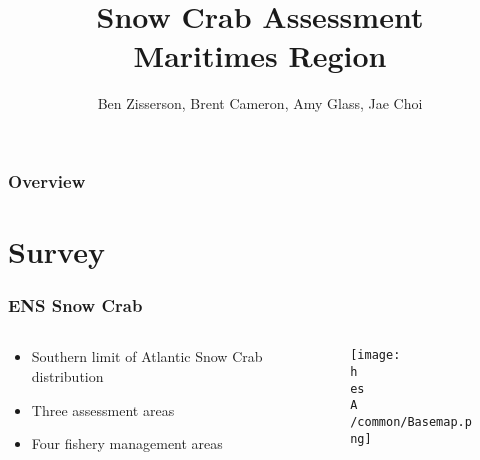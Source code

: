 \documentclass{beamer}
\title[Snow Crab Assessment \yr]{Snow Crab Assessment\\  Maritimes Region\\ \yr }
\author[Snow Crab Unit]{Ben Zisserson, Brent Cameron, Amy Glass, Jae Choi}
\institute[DFO Science]{
  Canadian Department of Fisheries and Oceans \\ %
  Science Branch \\
  Population Ecology Division
  \medskip
  \textit{} %
}
\numberwithin{equation}{section}		%
\numberwithin{figure}{section}	   	%
\numberwithin{table}{section}				%
\newcommand{\h}{C:/} %
\newcommand{\es}{bio.data/bio.snowcrab/} %
\newcommand{\A}{assessments/}
\begin{document}
  \begin{frame}
    \titlepage %
  \end{frame}
  

  \begin{frame}
    \frametitle{Overview} %
    \tableofcontents %
  \end{frame}
  
\section{Survey}
  \begin{frame}
    \frametitle{ENS Snow Crab}
    \begin{columns}
      \begin{column}{0.4\textwidth}
        \begin{itemize}
        
        	\item Southern limit of Atlantic Snow Crab distribution 
        	\item Three assessment areas
        	\item Four fishery management areas
        \end{itemize}
      \end{column}
      
      \begin{column}{0.6\textwidth}
      	\begin{centering}
          \begin{figure}
            \texttt{[image: \\h \\es \\A /common/Basemap.png]}
          \end{figure}
      	\end{centering}
      \end{column}
    \end{columns}
  \end{frame}
  
\end{document}
